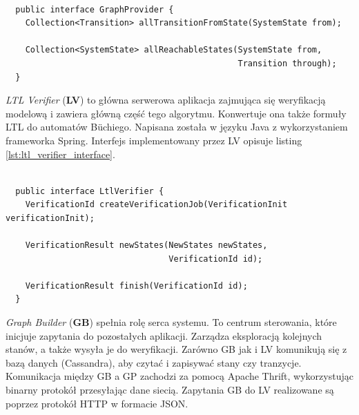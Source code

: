 \begin{lstlisting}[caption={Interfejs implementowany przez GP.},captionpos=b,label={lst:graph_provider_interface}]

  public interface GraphProvider {
    Collection<Transition> allTransitionFromState(SystemState from);

    Collection<SystemState> allReachableStates(SystemState from,
                                               Transition through);
  }
\end{lstlisting}

\textit{LTL Verifier} (\textbf{LV}) to główna serwerowa aplikacja zajmująca się weryfikacją modelową i zawiera główną część tego algorytmu.
Konwertuje ona także formuły LTL do automatów Büchiego.
Napisana została w języku Java z wykorzystaniem frameworka Spring.
Interfejs implementowany przez LV opisuje listing \ref{lst:ltl_verifier_interface}.

\begin{lstlisting}[caption={Interfejs implementowany przez LV.},captionpos=b,label={lst:ltl_verifier_interface}]

  public interface LtlVerifier {
    VerificationId createVerificationJob(VerificationInit verificationInit);

    VerificationResult newStates(NewStates newStates,
                                 VerificationId id);

    VerificationResult finish(VerificationId id);
  }
\end{lstlisting}

\textit{Graph Builder} (\textbf{GB}) spełnia rolę serca systemu.
To centrum sterowania, które inicjuje zapytania do pozostałych aplikacji.
Zarządza eksploracją kolejnych stanów, a także wysyła je do weryfikacji.
Zarówno GB jak i LV komunikują się z bazą danych (Cassandra), aby czytać i zapisywać stany czy tranzycje.
Komunikacja między GB a GP zachodzi za pomocą Apache Thrift, wykorzystując binarny protokół przesyłając dane siecią.
Zapytania GB do LV realizowane są poprzez protokół HTTP w formacie JSON.

